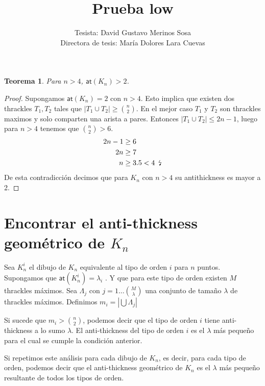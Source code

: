 \documentclass[11pt,helvetica,letter]{article}
\title{Prueba low}
\author{
Tesista: David Gustavo Merinos Sosa \\
Directora de tesis: María Dolores Lara Cuevas
}
\date{}
\newtheorem{theorem}{Teorema}
\newcommand{\ateq}[2]{
$\mathsf{at}(#1)=#2$
}
\begin{document}
\maketitle
\begin{theorem}
Para $n>4$, $\mathsf{at}(K_n)>2$.
\end{theorem}
\begin{proof}
  Supongamos \ateq{K_n}{2} con $n>4$. Esto implica que existen dos thrackles $T_1,T_2$
   tales que $|T_1 \cup T_2| \geq \binom{n}{2}$. En el mejor caso $T_1$ y $T_2$ son thrackles
   maximos y solo comparten una arista a pares. Entonces $|T_1 \cup T_2| \leq 2n-1$, luego para $n>4$
   tenemos que $\binom{n}{2}>6$.
   \begin{align*}
     2n-1 &\geq 6 \\
     2n &\geq 7 \\
     n &\geq 3.5 < 4 \enskip \text{\lightning}
   \end{align*}
   De esta contradicción decimos que para $K_n$ con $n>4$ su antithickness es mayor a 2.
\end{proof}

\section{Encontrar el anti-thickness geométrico de $K_n$}
Sea $K_n^i$ el dibujo de $K_n$ equivalente al tipo de orden $i$ para $n$ puntos. Supongamos que \ateq{K_n^i}{\lambda_i}.
Y que para este tipo de orden existen $M$ thrackles máximos. Sea $\Lambda_j$ con $j=1\dots\binom{M}{\lambda}$ una conjunto de
tamaño $\lambda$ de thrackles máximos. Definimos $m_i = |\bigcup \Lambda_j|$

Si sucede que $m_i > \binom{n}{2}$, podemos decir que el tipo de orden $i$ tiene
anti-thickness a lo sumo $\lambda$. El anti-thickness del tipo de orden $i$ es el $\lambda$ más pequeño
para el cual se cumple la condición anterior.

Si repetimos este análisis para cada dibujo de $K_n$, es decir, para cada tipo de orden, podemos decir que
el anti-thickness geométrico de $K_n$ es el $\lambda$ más pequeño resultante de todos los tipos de orden.

\end{document}
